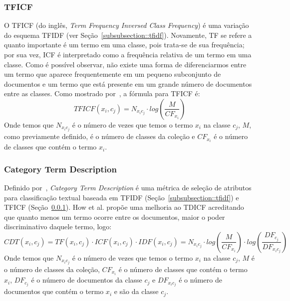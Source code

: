 \subsubsection{TFICF}
\label{subsubsection::tficf}

O TFICF (do inglês, \textit{Term Frequency Inversed Class Frequency}) é uma variação do esquema TFIDF (ver Seção~\ref{subsubsection::tfidf}). Novamente, TF se refere a quanto importante é um termo em uma classe, pois trata-se de sua frequência; por sua vez, ICF é interpretado como a frequência relativa de um termo em uma classe. Como é possível observar, não existe uma forma de diferenciarmos entre um termo que aparece frequentemente em um pequeno subconjunto de documentos e um termo que está presente em um grande número de documentos entre as classes. Como mostrado por~\cite{ChihHow04}, a fórmula para TFICF é:
\begin{equation}\label{eqn::tficf}
   TFICF(x_i, c_j) = N_{x_ic_j} \cdot log( \frac{M}{CF_{x_i}} )
\end{equation}
Onde temos que $N_{x_ic_j}$ é o número de vezes que temos o termo $x_i$ na classe $c_j$, $M$, como previamente definido, é o número de classes da coleção e $CF_{x_i}$ é o número de classes que contém o termo $x_i$. 

\subsubsection{Category Term Description}
\label{subsubsection::ctd}

Definido por~\cite{ChihHow04}, \textit{Category Term Description} é uma métrica de seleção de atributos para classificação textual baseada em TFIDF (Seção~\ref{subsubsection::tfidf}) e TFICF (Seção~\ref{subsubsection::tficf}). How et al. propõe uma melhoria ao TDICF acreditando que quanto menos um termo ocorre entre os documentos, maior o poder discriminativo daquele termo, logo:
\begin{equation}\label{eqn::cdt}
   CDT(x_i, c_j) = TF(x_i, c_j) \cdot ICF(x_i, c_j) \cdot IDF(x_i,c_j) =  N_{x_ic_j} \cdot log( \frac{M}{CF_{x_i}} ) \cdot  log( \frac{DF_{c_j}}{ DF_{x_ic_j} } )
\end{equation}
Onde temos que $N_{x_ic_j}$ é o número de vezes que temos o termo $x_i$ na classe $c_j$, $M$ é o número de classes da coleção, $CF_{x_i}$ é o número de classes que contém o termo $x_i$, $DF_{c_j}$ é o número de documentos da classe $c_j$ e $DF_{x_ic_j}$ é o número de documentos que contém o termo $x_i$ e são da classe $c_j$.

